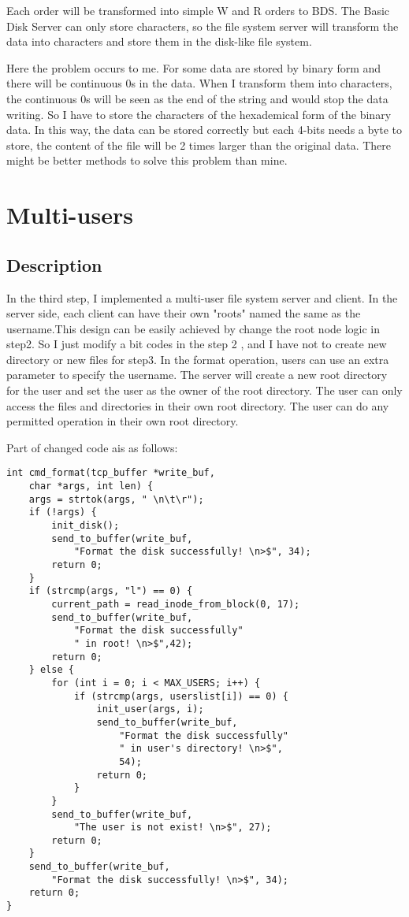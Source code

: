 \documentclass[a4paper]{article}
\begin{document}
Each order will be transformed into simple W and R orders to BDS. The Basic Disk Server can only store characters, so the file system server will transform the data into characters and store them in the disk-like file system. 

Here the problem occurs to me. For some data  are stored by binary form and there will be continuous 0s in the data. When I transform them into characters, the continuous 0s will be seen as the end of the string and would stop the data writing. So I have to store the characters of the hexademical form of the binary data.
In this way, the data can be stored correctly but each 4-bits needs a byte to store, the content of the file will be 2 times larger than the original data. There might be better methods to solve this problem than mine.



\section{Multi-users}
\subsection{Description}

In the third step, I implemented a multi-user file system server and client. In the server side, each client can have their own "roots" named the same as the username.This design can be easily achieved by change the root node logic in step2. So I just modify a bit codes in the step 2 , and I have not to create new directory or new files for step3. In the format operation, users can use an extra parameter to specify the username. The server will create a new root directory for the user and set the user as the owner of the root directory. The user can only access the files and directories in their own root directory. The user can do any permitted operation in their own root directory.

Part of changed code ais as follows:

\begin{lstlisting}
int cmd_format(tcp_buffer *write_buf, 
    char *args, int len) { 
    args = strtok(args, " \n\t\r");
    if (!args) {
        init_disk();
        send_to_buffer(write_buf, 
            "Format the disk successfully! \n>$", 34);
        return 0;
    }
    if (strcmp(args, "l") == 0) {
        current_path = read_inode_from_block(0, 17);
        send_to_buffer(write_buf, 
            "Format the disk successfully"
            " in root! \n>$",42);
        return 0;
    } else {
        for (int i = 0; i < MAX_USERS; i++) {
            if (strcmp(args, userslist[i]) == 0) {
                init_user(args, i);
                send_to_buffer(write_buf,
                    "Format the disk successfully"
                    " in user's directory! \n>$",
                    54);
                return 0;
            }
        }
        send_to_buffer(write_buf, 
            "The user is not exist! \n>$", 27);
        return 0;
    }
    send_to_buffer(write_buf, 
        "Format the disk successfully! \n>$", 34);
    return 0;
}
\end{lstlisting}
\end{document}
